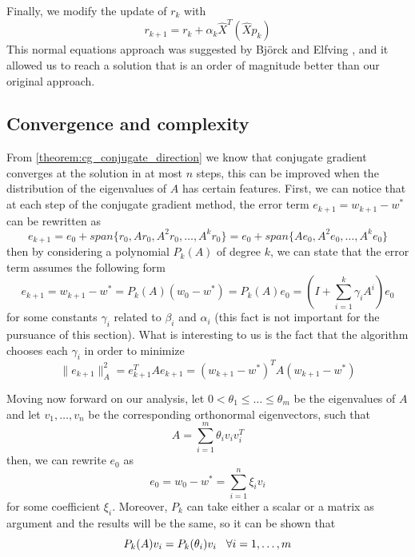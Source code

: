 \noindent Finally, we modify the update of $r_k$ with
\begin{equation}
    r_{k+1} = r_k + \alpha_k \hat{X}^T (\hat{X} p_k)
\end{equation}
This normal equations approach was suggested by Björck and Elfving \cite{bjorck1979accelerated}, and it allowed us to reach a solution that is an order of magnitude better than our original approach.

\subsection{Convergence and complexity}
From \autoref{theorem:cg_conjugate_direction} we know that conjugate gradient converges at the solution in at most $n$ steps, this can be improved when the distribution of the eigenvalues of $A$ has certain features. First, we can notice that at each step of the conjugate gradient method, the error term $e_{k+1}=w_{k+1}-w^*$ can be rewritten as
\begin{equation}
    e_{k+1} = e_0 + span\{r_0,Ar_0,A^2r_0,\dots,A^kr_0\} = e_0 + span\{Ae_0,A^2e_0,\dots,A^ke_0\}
    \label{eq:cg_error_subspace}
\end{equation}
then by considering a polynomial $P_k(A)$ of degree $k$, we can state that the error term assumes the following form
\begin{equation}
    e_{k+1} = w_{k+1}-w^* = P_k(A)(w_0-w^*) = P_k(A)e_0 = \left( I+\sum_{i=1}^k \gamma_iA^i \right)e_0
    \label{eq:cg_wk+1_and_wstar}
\end{equation}
for some constants $\gamma_i$ related to $\beta_i$ and $\alpha_i$ (this fact is not important for the pursuance of this section). What is interesting to us is the fact that the algorithm chooses each $\gamma_i$ in order to minimize
\begin{equation}
    \lVert e_{k+1}\rVert_A^2 = e_{k+1}^TAe_{k+1} = (w_{k+1}-w^*)^TA(w_{k+1}-w^*)
    \label{eq:cg_weighted_norm_c}
\end{equation}

\noindent Moving now forward on our analysis, let $0<\theta_1\leq\dots\leq\theta_m$ be the eigenvalues of $A$ and let $v_1,\dots, v_n$ be the corresponding orthonormal eigenvectors, such that
\begin{equation}
    A=\sum^m_{i=1}\theta_iv_iv^T_i
    \label{eq:cg_rewritten_matrix}
\end{equation}
then, we can rewrite $e_0$ as
\begin{equation}
    e_0=w_0-w^*=\sum_{i=1}^n\xi_i v_i
    \label{eq:cg_w0_wstar}
\end{equation}
for some coefficient $\xi_i$. Moreover, $P_k$ can take either a scalar or a matrix as argument and the results will be the same, so it can be shown that
\begin{equation}
    P_k(A)v_i=P_k(\theta_i)v_i \hspace{3mm} \forall i=1,\dots,m
\end{equation}


